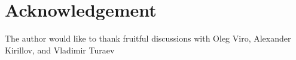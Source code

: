 \section*{Acknowledgement}

The author would like to thank fruitful discussions with Oleg
Viro, Alexander Kirillov, and Vladimir Turaev
